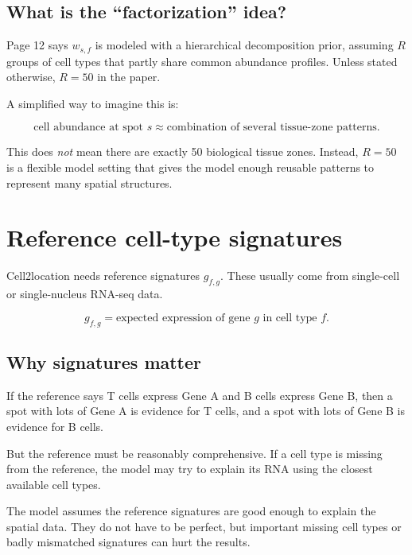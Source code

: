 \documentclass[11pt]{article}
\begin{document}
\subsection{What is the ``factorization'' idea?}

Page 12 says $w_{s,f}$ is modeled with a hierarchical decomposition prior, assuming $R$ groups of cell types that partly share common abundance profiles. Unless stated otherwise, $R=50$ in the paper.

A simplified way to imagine this is:

\[
\text{cell abundance at spot }s
\approx
\text{combination of several tissue-zone patterns}.
\]

This does \emph{not} mean there are exactly 50 biological tissue zones. Instead, $R=50$ is a flexible model setting that gives the model enough reusable patterns to represent many spatial structures.

\section{Reference cell-type signatures}

Cell2location needs reference signatures $g_{f,g}$. These usually come from single-cell or single-nucleus RNA-seq data.

\begin{mathbox}
\[
g_{f,g} = \text{expected expression of gene } g \text{ in cell type } f.
\]
\end{mathbox}

\subsection{Why signatures matter}

If the reference says T cells express Gene A and B cells express Gene B, then a spot with lots of Gene A is evidence for T cells, and a spot with lots of Gene B is evidence for B cells.

But the reference must be reasonably comprehensive. If a cell type is missing from the reference, the model may try to explain its RNA using the closest available cell types.

\begin{assumptionbox}
The model assumes the reference signatures are good enough to explain the spatial data. They do not have to be perfect, but important missing cell types or badly mismatched signatures can hurt the results.
\end{assumptionbox}
\end{document}
